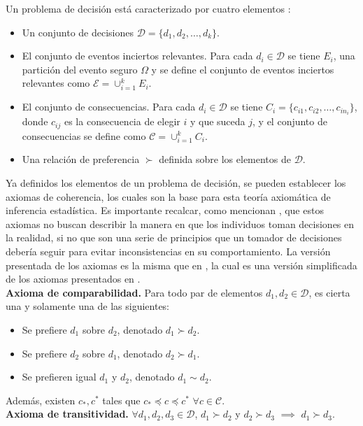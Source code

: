\documentclass[11pt,a4paper]{article}
\begin{document}
Un problema de decisión está caracterizado por cuatro elementos \citep{mendoza}:
\begin{itemize}
\item Un conjunto de decisiones $\mathcal{D} = \lbrace d_1, d_2, \dots, d_k\rbrace$.
\item El conjunto de eventos inciertos relevantes. Para cada $d_i \in \mathcal{D}$ se tiene $E_i$, una partición del evento seguro $\Omega$ y se define el conjunto de eventos inciertos relevantes como $\mathcal{E} = \cup_{i=1}^k E_i$.
\item El conjunto de consecuencias. Para cada $d_i \in \mathcal{D}$ se tiene $C_i = \lbrace c_{i1}, c_{i2}, \dots, c_{in_i}\rbrace$, donde $c_{ij}$ es la consecuencia de elegir $i$ y que suceda $j$, y el conjunto de consecuencias se define como $\mathcal{C} = \cup_{i=1}^k C_i$.
\item Una relación de preferencia $\succ$ definida sobre los elementos de $\mathcal{D}$.
\end{itemize}

Ya definidos los elementos de un problema de decisión, se pueden establecer los axiomas de coherencia, los cuales son la base para esta teoría axiomática de inferencia estadística. Es importante recalcar, como mencionan \citet{bernardo}, que estos axiomas no buscan describir la manera en que los individuos toman decisiones en la realidad, si no que son una serie de principios que un tomador de decisiones debería seguir para evitar inconsistencias en su comportamiento. La versión presentada de los axiomas es la misma que en \citet{mendoza}, la cual es una versión simplificada de los axiomas presentados en \citet{bernardo}.\\

\textbf{Axioma de comparabilidad.} Para todo par de elementos $d_1, d_2 \in \mathcal{D}$, es cierta una y solamente una de las siguientes:
\begin{itemize}
\item Se prefiere $d_1$ sobre $d_2$, denotado $d_1 \succ d_2$.
\item  Se prefiere $d_2$ sobre $d_1$, denotado $d_2 \succ d_1$.
\item Se prefieren igual $d_1$ y $d_2$, denotado $d_1 \sim d_2$.
\end{itemize}
Además, existen $c_*, c^*$ tales que $c_* \preceq c \preceq c^*$ $\forall c \in \mathcal{C}$.\\

\textbf{Axioma de transitividad.} $\forall d_1, d_2, d_3 \in \mathcal{D}$, $d_1 \succ d_2$ y $d_2 \succ d_3$ $\implies$ $d_1 \succ d_3$.\\
\end{document}
